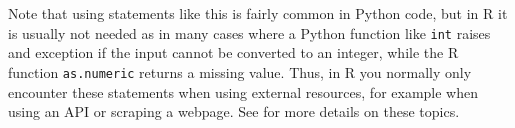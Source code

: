 Note that using  statements like this is fairly common in Python code,
but in R it is usually not needed as in many cases where a Python function like \verb|int| raises and exception
if the input cannot be converted to an integer, while the R function \verb|as.numeric| returns a missing value.
Thus, in R you normally only encounter these statements when using external resources,
for example when using an API or scraping a webpage. See  for more details on these topics. 

